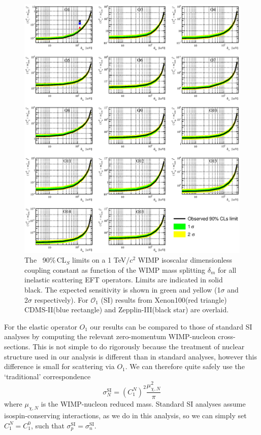 \begin{figure}
\begin{minipage}{1.\linewidth}
\centerline{\includegraphics[width=\textwidth,height=0.99\textheight,keepaspectratio]{Figures/FinalInelastic.eps}}
\end{minipage}
\caption{The \Xehund\ 90\%\,CL$_S$ limits on a 1 TeV/$c^2$ WIMP isoscalar dimensionless coupling constant as function of the WIMP mass splitting $\delta_m$  for all inelastic scattering EFT operators. Limits are indicated in solid black. The expected sensitivity is shown in green and yellow (1$\sigma$ and 2$\sigma$ respectively). For $\mathcal{O}_1$ (SI) results from Xenon100(red triangle) CDMS-II(blue rectangle) and Zepplin-III(black star) are overlaid.}
\label{fig:InelasticLimit}
\end{figure}

For the elastic operator $O_1$ our results can be compared to those of standard SI analyses by computing the relevant zero-momentum WIMP-nucleon cross-sections. This is not simple to do rigorously because the treatment of nuclear structure used in our analysis is different than in standard analyses, however this difference is small for scattering via $O_1$. We can therefore quite safely use the `traditional' correspondence~\cite{DeSimone:2016fbz}
%
\begin{equation}
\sigma_{N}^\mathrm{SI} = \left(C^N_1\right)^2 \frac{\mu_{\chi,N}^2}{\pi}
\end{equation}
%
where $\mu_{\chi,N}$ is the WIMP-nucleon reduced mass. Standard SI analyses assume isospin-conserving interactions, as we do in this analysis, so we can simply set $C^N_1 = C^0_1$, such that $\sigma_{p}^\mathrm{SI}=\sigma_{n}^\mathrm{SI}$. 

